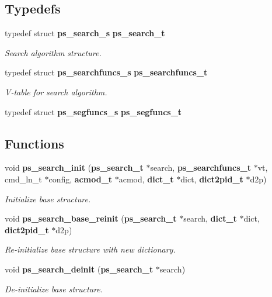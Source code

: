 \subsection*{Typedefs}
\begin{DoxyCompactItemize}
\item 
typedef struct {\bf ps\-\_\-search\-\_\-s} {\bf ps\-\_\-search\-\_\-t}\label{pocketsphinx__internal_8h_adc3de4d62e46c5e6cb93d09fb61be8ee}

\begin{DoxyCompactList}\small\item\em Search algorithm structure. \end{DoxyCompactList}\item 
typedef struct {\bf ps\-\_\-searchfuncs\-\_\-s} {\bf ps\-\_\-searchfuncs\-\_\-t}\label{pocketsphinx__internal_8h_a0eae078e32bd5f339792884c68aad8b3}

\begin{DoxyCompactList}\small\item\em V-\/table for search algorithm. \end{DoxyCompactList}\item 
typedef struct {\bf ps\-\_\-segfuncs\-\_\-s} {\bfseries ps\-\_\-segfuncs\-\_\-t}\label{pocketsphinx__internal_8h_a08187b85c6bc5b4991632dc78e237977}

\end{DoxyCompactItemize}
\subsection*{Functions}
\begin{DoxyCompactItemize}
\item 
void {\bf ps\-\_\-search\-\_\-init} ({\bf ps\-\_\-search\-\_\-t} $\ast$search, {\bf ps\-\_\-searchfuncs\-\_\-t} $\ast$vt, cmd\-\_\-ln\-\_\-t $\ast$config, {\bf acmod\-\_\-t} $\ast$acmod, {\bf dict\-\_\-t} $\ast$dict, {\bf dict2pid\-\_\-t} $\ast$d2p)\label{pocketsphinx__internal_8h_ad848d8d0cf0398542bfb74a2e34dbff3}

\begin{DoxyCompactList}\small\item\em Initialize base structure. \end{DoxyCompactList}\item 
void {\bf ps\-\_\-search\-\_\-base\-\_\-reinit} ({\bf ps\-\_\-search\-\_\-t} $\ast$search, {\bf dict\-\_\-t} $\ast$dict, {\bf dict2pid\-\_\-t} $\ast$d2p)\label{pocketsphinx__internal_8h_a307801961f27bd5f4b82a3e6b83e0ca1}

\begin{DoxyCompactList}\small\item\em Re-\/initialize base structure with new dictionary. \end{DoxyCompactList}\item 
void {\bf ps\-\_\-search\-\_\-deinit} ({\bf ps\-\_\-search\-\_\-t} $\ast$search)\label{pocketsphinx__internal_8h_a1299496b3498166928702d0701934e50}

\begin{DoxyCompactList}\small\item\em De-\/initialize base structure. \end{DoxyCompactList}\end{DoxyCompactItemize}


